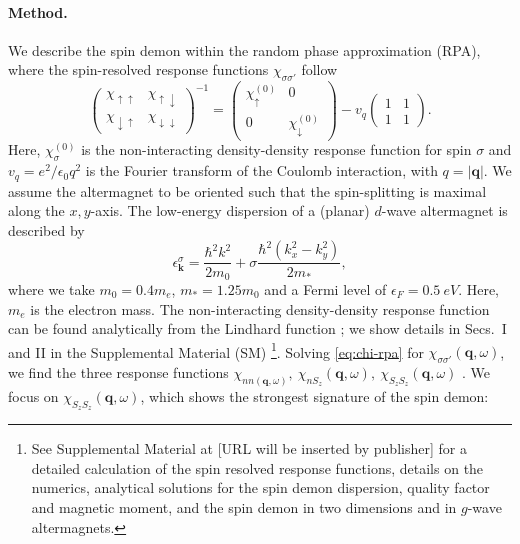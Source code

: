 \documentclass[aps,prl,reprint,twocolumns,superscriptaddress]{revtex4-2}
\DeclareMathOperator{\Imm}{Im}
\newcommand{\Fermilevel}{\SI{0.5}{eV}}
\newcommand{\mstar}{1.25}
\newcommand{\mzero}{0.4}
\newcommand{\subfigref}[2]{Fig.~\hyperref[#1]{\ref*{#1}#2}}
\begin{document}
	
	
	
	
	
	
	\paragraph{Method.}
	We describe the spin demon within the random phase approximation (RPA), where the spin-resolved response functions $\chi_{\sigma\sigma'}$ follow \cite{giulianiQuantumTheoryElectron2005}
	\begin{equation}
		\begin{pmatrix}
			\chi_{\uparrow\uparrow} & \chi_{\uparrow\downarrow} \\ 
			\chi_{\downarrow\uparrow} & \chi_{\downarrow\downarrow}
		\end{pmatrix}^{-1} = \begin{pmatrix}
			\chi_\uparrow^{(0)} & 0 \\
			0 & \chi_\downarrow^{(0)}
		\end{pmatrix}
		- v_q \begin{pmatrix}
			1 & 1 \\ 1 & 1 
		\end{pmatrix} \label{eq:chi-rpa}.
	\end{equation}
	Here, $\chi_\sigma^{(0)}$ is the non-interacting density-density response function for spin $\sigma$ and $v_q=e^2/\epsilon_0 q^2$ is the Fourier transform of the Coulomb interaction, with $q=|\bm q|$. We assume the altermagnet to be oriented such that the spin-splitting is maximal along the $x,y$-axis. The low-energy dispersion of a (planar) $d$-wave altermagnet is  described by \cite{smejkalEmergingResearchLandscape2022}
	\begin{equation}
		\epsilon_{\bm k}^\sigma = \frac{\hbar^2 k^2}{2m_0} + \sigma\frac{\hbar^2 \left( k_x^2-k_y^2\right)}{2m_*} ,
	\end{equation}
	where we take $m_0=\mzero m_e$, $m_*=\mstar m_0$ and a Fermi level of $\epsilon_F=\Fermilevel$. Here, $m_e$ is the electron mass.
	The non-interacting density-density response function can  be found analytically from the Lindhard function \cite{ahnAnisotropicFermionicQuasiparticles2021}; we show details in Secs.~I and II in the Supplemental Material (SM) \footnote{See Supplemental Material at [URL will be inserted by publisher] for a detailed calculation of the spin resolved response functions, details on the numerics, analytical solutions for the spin demon dispersion, quality factor and magnetic moment, and the spin demon in two dimensions and in $g$-wave altermagnets.}. Solving \cref{eq:chi-rpa} for $\chi_{\sigma\sigma'}(\bm q,\omega)$, we find the three response functions $\chi_{nn(\bm q,\omega)},\ \chi_{nS_z}(\bm q,\omega),\ \chi_{S_zS_z}(\bm q,\omega)$ \cite{giulianiQuantumTheoryElectron2005}. We focus on $\chi_{S_zS_z}(\bm q,\omega)$, which shows the strongest signature of the spin demon:
\end{document}
